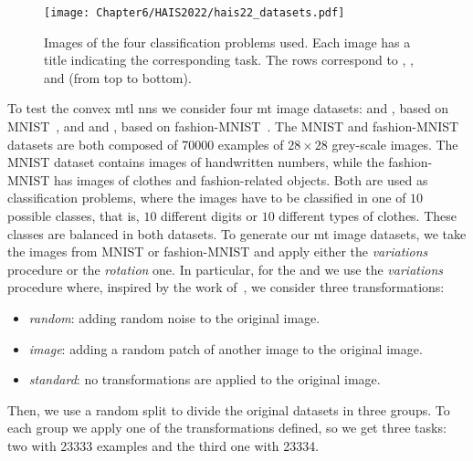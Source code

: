 \begin{figure}[t!]
    \texttt{[image: Chapter6/HAIS2022/hais22\_datasets.pdf]}
    \caption[Images of the four classification problems used.]{Images of the four classification problems used. Each image has a title indicating the corresponding task. The rows correspond to , ,  and  (from top to bottom).}
    \label{fig:problems_hais2022}
\end{figure}

To test the convex \acrshort{mtl} \acrshort{nns} we consider four \acrshort{mt} image datasets:
 and , based on MNIST~\citep{LeCunBBH98}, and  and , based on fashion-MNIST~\citep{xiao2017}.
%
The MNIST and fashion-MNIST datasets are both composed of \num{70000} examples of $28\times 28$ grey-scale images. The MNIST dataset contains images of handwritten numbers, while the fashion-MNIST has images of clothes and fashion-related objects.
Both are used as classification problems, where the images have to be classified in one of $10$ possible classes, that is, $10$ different digits or $10$ different types of clothes. These classes are balanced in both datasets.
%
To generate our \acrshort{mt} image datasets, we take the images from MNIST or fashion-MNIST and apply either the \emph{variations} procedure or the \emph{rotation} one.
%
In particular, for the  and  we use the \emph{variations} procedure where, inspired by the work of~\cite{BergstraB12}, we consider three transformations:
\begin{itemize}
    \item \textit{random}: adding random noise to the original image.
    \item \textit{image}: adding a random patch of another image to the original image.
    \item \textit{standard}: no transformations are applied to the original image.
\end{itemize}
Then, we use a random split to divide the original datasets in three groups. To each group we apply one of the transformations defined, so we get three tasks: two with \num{23333} examples and the third one with \num{23334}.

